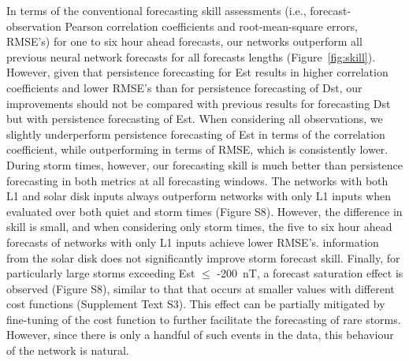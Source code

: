\documentclass[draft,linenumbers]{agujournal2018}
\begin{document}
In terms of the conventional forecasting skill assessments (i.e., forecast-observation Pearson correlation coefficients and root-mean-square errors, RMSE's) for one to six hour ahead forecasts, our networks outperform all previous neural network forecasts for all forecasts lengths (Figure~\ref{fig:skill}). However, given that persistence forecasting for Est results in higher correlation coefficients and lower RMSE's than for persistence forecasting of Dst, our improvements should not be compared with previous results for forecasting Dst but with persistence forecasting of Est. When considering all observations, we slightly underperform persistence forecasting of Est in terms of the correlation coefficient, while outperforming in terms of RMSE, which is consistently lower. During storm times, however, our forecasting skill is much better than persistence forecasting in both metrics at all forecasting windows. The networks with both L1 and solar disk inputs always outperform networks with only L1 inputs when evaluated over both quiet and storm times (Figure S8). However, the difference in skill is small, and when considering only storm times, the five to six hour ahead forecasts of networks with only L1 inputs achieve lower RMSE's.  information from the solar disk does not significantly improve storm forecast skill. Finally, for particularly large storms exceeding Est $\leq$ -200~nT, a forecast saturation effect is observed (Figure S8), similar to that that occurs at smaller values with different cost functions (Supplement Text S3). This effect can be partially mitigated by fine-tuning of the cost function to further facilitate the forecasting of rare storms. However, since there is only a handful of such events in the data, this behaviour of the network is natural.
\end{document}

